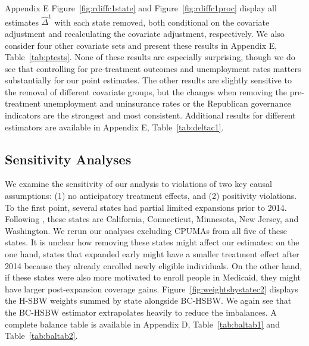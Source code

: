 \documentclass[aoas]{imsart}
\theoremstyle{plain}
\theoremstyle{remark}
\begin{document}
Appendix E Figure~\ref{fig:rdiffc1state} and Figure~\ref{fig:rdiffc1proc} display all estimates $\hat{\Delta}^1$ with each state removed, both conditional on the covariate adjustment and recalculating the covariate adjustment, respectively. We also consider four other covariate sets and present these results in Appendix E, Table~\ref{tab:ptests}. None of these results are especially surprising, though we do see that controlling for pre-treatment outcomes and unemployment rates matters substantially for our point estimates. The other results are slightly sensitive to the removal of different covariate groups, but the changes when removing the pre-treatment unemployment and uninsurance rates or the Republican governance indicators are the strongest and most consistent. Additional results for different estimators are available in Appendix E, Table~\ref{tab:deltac1}.

\subsection{Sensitivity Analyses} \label{sssec:sensitivity}

We examine the sensitivity of our analysis to violations of two key causal assumptions: (1) no anticipatory treatment effects, and (2) positivity violations. To the first point, several states had partial limited expansions prior to 2014. Following \cite{frean2017premium}, these states are California, Connecticut, Minnesota, New Jersey, and Washington. We rerun our analyses excluding CPUMAs from all five of these states. It is unclear how removing these states might affect our estimates: on the one hand, states that expanded early might have a smaller treatment effect after 2014 because they already enrolled newly eligible individuals. On the other hand, if these states were also more motivated to enroll people in Medicaid, they might have larger post-expansion coverage gains. Figure~\ref{fig:weightsbystatec2} displays the H-SBW weights summed by state alongside BC-HSBW. We again see that the BC-HSBW estimator extrapolates heavily to reduce the imbalances. A complete balance table is available in Appendix D, Table~\ref{tab:baltab1} and Table~\ref{tab:baltab2}.
\end{document}
